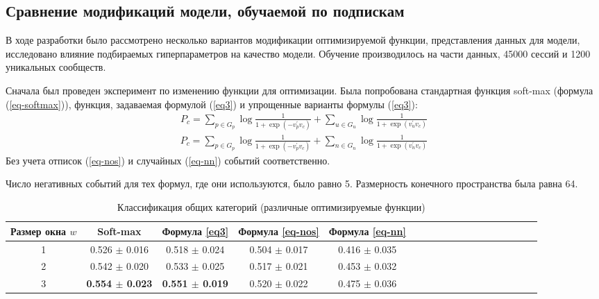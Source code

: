 \documentclass[times,specification,annotation]{itmo-student-thesis}
\begin{document}
\subsection{Сравнение модификаций модели, обучаемой по подпискам}\label{class-model}

В ходе разработки было рассмотрено несколько вариантов модификации оптимизируемой функции, представления данных для модели, исследовано влияние подбираемых гиперпараметров на качество модели. Обучение производилось на части данных, 45000 сессий и 1200 уникальных сообществ.

Сначала был проведен эксперимент по изменению функции для оптимизации. Была попробована стандартная функция soft-max (формула (\ref{eq-softmax})), функция, задаваемая формулой  (\ref{eq3}) и упрощенные варианты формулы  (\ref{eq3}):
\begin{align}
P_c = \sum_{p \in G_p} \log \frac{1}{1 + \exp(-v_p^{'}v_c)} + \sum_{u \in G_u} \log \frac{1}{1 + \exp(v_u^{'}v_c)} \label{eq-nos}
\end{align}
\begin{align}
P_c = \sum_{p \in G_p} \log \frac{1}{1 + \exp(-v_p^{'}v_c)} + \sum_{n \in G_n} \log \frac{1}{1 + \exp(v_n^{'}v_c)} \label{eq-nn}
\end{align}
Без учета отписок (\ref{eq-nos}) и случайных (\ref{eq-nn}) событий соответственно.

Число негативных событий для тех формул, где они используются, было равно 5. Размерность конечного пространства была равна 64.

\begin{table}[!h]
\caption{Классификация общих категорий (различные оптимизируемые функции)}\label{tab-cmp-f}
\centering
\begin{tabular}{|*{18}{c|}}\hline
Размер окна $w$ & Soft-max  & Формула \ref{eq3} & Формула \ref{eq-nos} & Формула \ref{eq-nn}   \\\hline
1    & 0.526 $\pm$ 0.016 & 0.518 $\pm$ 0.024 & 0.504 $\pm$ 0.017 & 0.416 $\pm$ 0.035 \\\hline
2    & 0.542 $\pm$ 0.020 & 0.533 $\pm$ 0.025 & 0.517 $\pm$ 0.021 & 0.453 $\pm$ 0.032 \\\hline
3    & \textbf{0.554 $\pm$ 0.023} & \textbf{0.551 $\pm$ 0.019} & 0.520 $\pm$ 0.022 & 0.475 $\pm$ 0.036 \\\hline
\end{tabular}
\end{table}
\end{document}
